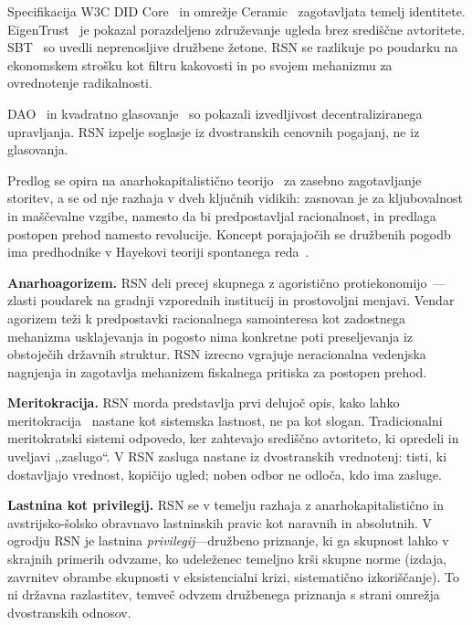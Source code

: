\documentclass[11pt,a4paper,twocolumn]{article}
\begin{document}
Specifikacija W3C DID Core~\cite{did2022} in omrežje Ceramic~\cite{ceramic2023} zagotavljata temelj identitete. EigenTrust~\cite{kamvar2003} je pokazal porazdeljeno združevanje ugleda brez središčne avtoritete. SBT~\cite{weyl2022} so uvedli neprenosljive družbene žetone. RSN se razlikuje po poudarku na ekonomskem strošku kot filtru kakovosti in po svojem mehanizmu za ovrednotenje radikalnosti.

DAO~\cite{buterin2014} in kvadratno glasovanje~\cite{buterin2019} so pokazali izvedljivost decentraliziranega upravljanja. RSN izpelje soglasje iz dvostranskih cenovnih pogajanj, ne iz glasovanja.

Predlog se opira na anarhokapitalistično teorijo~\cite{rothbard1973,hoppe2001} za zasebno zagotavljanje storitev, a se od nje razhaja v dveh ključnih vidikih: zasnovan je za kljubovalnost in maščevalne vzgibe, namesto da bi predpostavljal racionalnost, in predlaga postopen prehod namesto revolucije. Koncept porajajočih se družbenih pogodb ima predhodnike v Hayekovi teoriji spontanega reda~\cite{hayek1973}.

\textbf{Anarhoagorizem.} RSN deli precej skupnega z agoristično protiekonomijo~\cite{konkin2006}---zlasti poudarek na gradnji vzporednih institucij in prostovoljni menjavi. Vendar agorizem teži k predpostavki racionalnega samointeresa kot zadostnega mehanizma usklajevanja in pogosto nima konkretne poti preseljevanja iz obstoječih državnih struktur. RSN izrecno vgrajuje neracionalna vedenjska nagnjenja in zagotavlja mehanizem fiskalnega pritiska za postopen prehod.

\textbf{Meritokracija.} RSN morda predstavlja prvi delujoč opis, kako lahko meritokracija~\cite{young1958} nastane kot sistemska lastnost, ne pa kot slogan. Tradicionalni meritokratski sistemi odpovedo, ker zahtevajo središčno avtoriteto, ki opredeli in uveljavi ,,zaslugo``. V RSN zasluga nastane iz dvostranskih vrednotenj: tisti, ki dostavljajo vrednost, kopičijo ugled; noben odbor ne odloča, kdo ima zasluge.

\textbf{Lastnina kot privilegij.} RSN se v temelju razhaja z anarhokapitalistično in avstrijsko-šolsko obravnavo lastninskih pravic kot naravnih in absolutnih. V ogrodju RSN je lastnina \emph{privilegij}---družbeno priznanje, ki ga skupnost lahko v skrajnih primerih odvzame, ko udeleženec temeljno krši skupne norme (izdaja, zavrnitev obrambe skupnosti v eksistencialni krizi, sistematično izkoriščanje). To ni državna razlastitev, temveč odvzem družbenega priznanja s strani omrežja dvostranskih odnosov.
\end{document}
